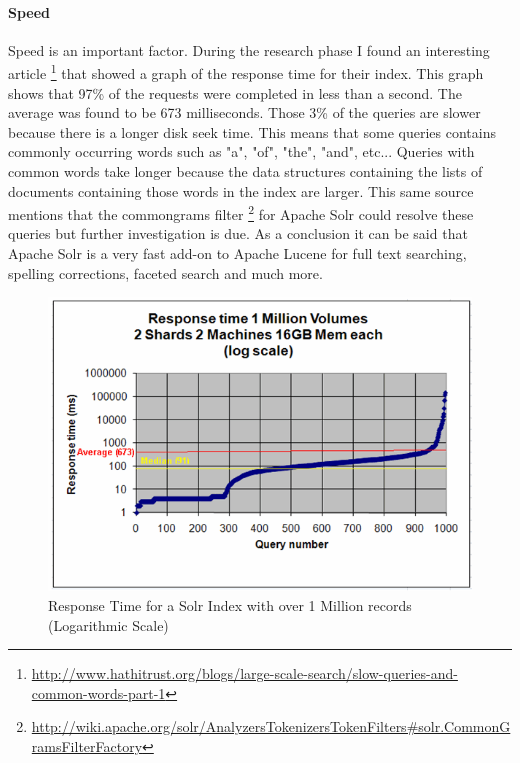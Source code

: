 \paragraph{Speed} Speed is an important factor. During the research phase I found an interesting article \footnote{\url{http://www.hathitrust.org/blogs/large-scale-search/slow-queries-and-common-words-part-1}} that showed a graph of the response time for their index. 
This graph shows that 97\% of the requests were completed in less than a second. The average was found to be 673 milliseconds. Those 3\% of the queries are slower because there is a longer disk seek time. This means that some queries contains commonly occurring words such as "a", "of", "the", "and", etc... Queries with common words take longer because the data structures containing the lists of documents containing those words in the index are larger.
This same source mentions that the common\-grams filter \footnote{\url{http://wiki.apache.org/solr/AnalyzersTokenizersTokenFilters\#solr.CommonGramsFilterFactory}} for Apache Solr could resolve these queries but further investigation is due. As a conclusion it can be said that Apache Solr is a very fast add-on to Apache Lucene for full text searching, spelling corrections, faceted search and much more.

\begin{figure}[H]
     \includegraphics[width=\textwidth]{images/response_time.png}
     \caption{Response Time for a Solr Index with over 1 Million records (Logarithmic Scale)}
\end{figure}


